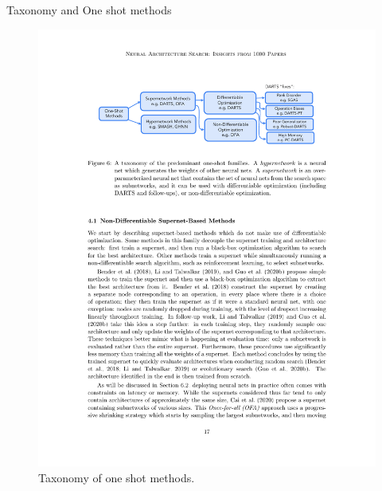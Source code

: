 \documentclass[aspectratio=169,xcolor=dvipsnames]{beamer}
\begin{document}
\begin{frame}{Taxonomy and One shot methods}
    \begin{figure}[htbp]
        \centering
        \includegraphics[height=.3\textheight]{taxonomy.pdf}
        \caption{Taxonomy of one shot methods.}
    \end{figure}
    \begin{figure}[htbp]
        \centering

\end{figure}
\end{frame}
\end{document}
